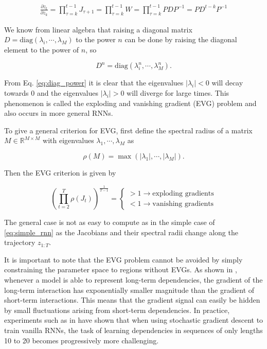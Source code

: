\begin{align}
    \frac{\partial z_{t}}{\partial z_{k}} = \prod_{\tau=k}^{t-1} J_{\tau+1}
                                          = \prod_{\tau=k}^{t-1} W 
                                          = \prod_{\tau=k}^{t-1} P D P^{-1}
                                          = P D^{t-k} P^{-1}
    \label{eq:bptt_evg}
\end{align}

We know from linear algebra that raising a diagonal matrix $D = \text{diag}(\lambda_i, \cdots, \lambda_M)$ to the power $n$ can be done by raising
the diagonal element to the power of $n$, so

\begin{equation}
    D^n = \text{diag}(\lambda_i^{n}, \cdots, \lambda_M^{n}).
    \label{eq:diag_power}
\end{equation}

From Eq. \ref{eq:diag_power} it is clear that the eigenvalues $|\lambda_i| < 0$ will decay towards 0 and the eigenvalues $|\lambda_i| > 0$ will diverge for large times. 
This phenomenon is called the exploding and vanishing gradient (EVG) problem and also occurs in more general RNNs. 

To give a general criterion for EVG, first define the spectral radius of a matrix $M \in \mathbb{R}^{M \times M}$ with eigenvalues $\lambda_1, \cdots, \lambda_M$ as 

\begin{equation}
    \rho (M) = \max \left( |\lambda_1|, \cdots, |\lambda_M| \right).
\end{equation}

Then the EVG criterion is given by 

\begin{equation}
    \left(\prod_{t=2}^{T} \rho(J_t)\right)^{\frac{1}{T-1}} = 
    \begin{cases}
        > 1 \rightarrow \text{exploding gradients} \\
        < 1 \rightarrow \text{vanishing gradients}
    \end{cases}
\end{equation}

The general case is not as easy to compute as in the simple case of \ref{eq:simple_rnn} as the Jacobians and their spectral radii change along the trajectory $z_{1:T}$.

It is important to note that the EVG problem cannot be avoided by simply constraining the parameter space to regions without EVGs. As shown in \cite{bengio1993problem},
whenever a model is able to represent long-term dependencies, the gradient of the long-term interaction has exponentially smaller magnitude than the gradient of 
short-term interactions. This means that the gradient signal can easily be hidden by small fluctuations arising from short-term dependencies.
In practice, experiments such as in \cite{bengio1994learning} have shown that when using stochastic gradient descent to train vanilla RNNs, 
the task of learning dependencies in sequences of only lengths 10 to 20 becomes progressively more challenging.

